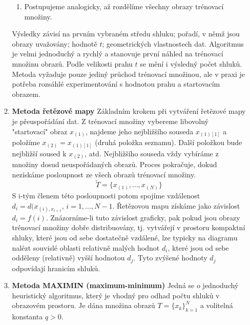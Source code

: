 \begin{enumerate}[label=(\Alph*)]
\begin{enumerate}[label=\arabic*.]
\begin{enumerate}[label=(\roman*)]
\item Postupujeme analogicky, až rozdělíme všechny obrazy trénovací množiny.
\end{enumerate}
Výsledky závisí na prvním vybraném středu shluku; pořadí, v němž jsou obrazy uvažovány; hodnotě $ t $; geometrických vlastnostech dat. Algoritmus je velmi jednoduchý a rychlý a stanovuje první náhled na trénovací množinu obrazů. Podle velikosti prahu $ t $ se mění i výsledný počet shluků. Metoda vyžaduje pouze jediný průchod trénovací množinou, ale v praxi je potřeba rozsáhlé experimentování s hodnotou prahu a startovacím obrazem.

\item \textbf{Metoda řetězové mapy}
Základním krokem při vytváření řetězové mapy je přeuspořádání dat. Z trénovací množiny vybereme libovolný "startovací" obraz $ x_{(1)} $, najdeme jeho nejbližšího souseda $ x_{(1)[1]} $ a položíme $ x_{(2)} = x_{(1)[1]} $ (druhá položka seznamu). Další položkou bude nejbližší soused k $ x_{(2)} $, atd. Nejbližšího souseda vždy vybíráme z množiny dosud neuspořádaných obrazů. Proces pokračuje, dokud nezískáme posloupnost ze všech obrazů trénovací množiny.
\begin{equation}
\tilde{T} = \{x_{(1)}, ..., x_{(N)}\}
\end{equation}
S i-tým členem této posloupnosti potom spojíme vzdálenost $ d_i = d(x_{(i), x_{i+1}}, \, i=1,...,N-1 $. Řetězovou mapu získáme jako závislost $ d_i = f(i) $. Znázorníme-li tuto závislost graficky, pak pokud jsou obrazy trénovací množiny dobře distribuovány, tj. vytvářejí v prostoru kompaktní shluky, které jsou od sebe dostatečně vzdálené, lze typicky na diagramu nalézt souvislé oblasti relativně malých hodnot $ d_i $, které jsou od sebe odděleny (relativně) vyšší hodnotou $ d_j $. Tyto zvýšené hodnoty $ d_j $ odpovídají hranicím shluků.

\item \textbf{Metoda MAXIMIN (maximum-minimum)}
Jedná se o jednoduchý heuristický algoritmus, který je vhodný pro odhad počtu shluků v obrazovém prostoru. Je dána množina obrazů $ T = \{x_k\}_{k=1}^N $ a volitelná konstanta $ q > 0 $.


\end{enumerate}
\end{enumerate}
